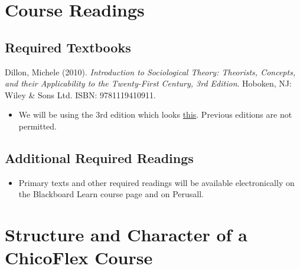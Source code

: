 \documentclass[11pt,]{article}
\providecommand{\tightlist}{%
  \setlength{\itemsep}{0pt}\setlength{\parskip}{0pt}}
\begin{document}
\hypertarget{course-readings}{%
\section{Course Readings}\label{course-readings}}

\hypertarget{required-textbooks}{%
\subsection{Required Textbooks}\label{required-textbooks}}

Dillon, Michele (2010).
\emph{Introduction to Sociological Theory: Theorists, Concepts, and their Applicability to the Twenty-First Century, 3rd Edition}.
Hoboken, NJ: Wiley \& Sons Ltd. ISBN: 9781119410911.

\begin{itemize}
\tightlist
\item
  We will be using the 3rd edition which looks
  \href{https://www.abebooks.com/Introduction-Sociological-Theory-Theorists-Concepts-Applicability/31208296728/bd?cm_mmc=ggl-_-US_Shopp_Textbook-_-product_id=COM9781119410911USED-_-keyword=\&gclid=Cj0KCQjwuO6WBhDLARIsAIdeyDLJvr2N_LKW1qd-49HuMemlLuCRQT4yR3PKWnmeqMDWBDwy9LNFFRUaAlcyEALw_wcB}{this}.
  Previous editions are not permitted.
\end{itemize}

\hypertarget{additional-required-readings}{%
\subsection{Additional Required
Readings}\label{additional-required-readings}}

\begin{itemize}
\tightlist
\item
  Primary texts and other required readings will be available
  electronically on the Blackboard Learn course page and on Perusall.
\end{itemize}

\hypertarget{structure-and-character-of-a-chicoflex-course}{%
\section{Structure and Character of a ChicoFlex
Course}\label{structure-and-character-of-a-chicoflex-course}}
\end{document}
